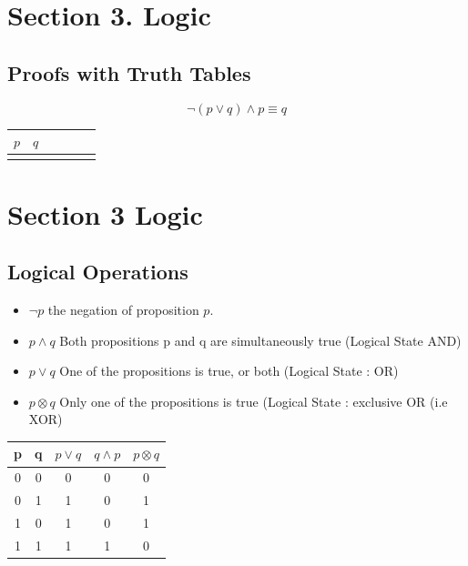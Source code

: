 \documentclass[]{report}
\begin{document}
\section*{Section 3. Logic}

\subsection*{Proofs with Truth Tables}

\[ \neg(p \vee q) \wedge p \equiv q \]
\begin{center}
\begin{tabular}{|c|c||c|c||c|c|}
\hline $p$ & $q$ &  &  &  &  \\ 
\hline  &  &  &  &  &  \\ 
\hline 
\end{tabular} 
\end{center}



\section{Section 3 Logic}
\subsection{Logical Operations}
\begin{itemize}
\item $\neg p$ the negation of proposition $p$.
\item $p \wedge q$ Both propositions p and q are simultaneously true (Logical State AND)
\item $p \vee q $ One of the propositions is true, or both (Logical State : OR)
\item $p \otimes q$ Only one of the propositions is true (Logical State : exclusive OR (i.e XOR)
\end{itemize}
\begin{center}
\begin{tabular}{|c|c|c|c|c|}
\hline
p & q & $p \vee q$ & $q \wedge p$ & $p \otimes q$ \\
\hline
0 & 0 & 0 & 0 & 0 \\
0 & 1 & 1 & 0 & 1\\
1 & 0 & 1 & 0 & 1 \\
1 & 1 & 1 & 1 & 0\\
\hline
\end{tabular}
\end{center}
\end{document}
